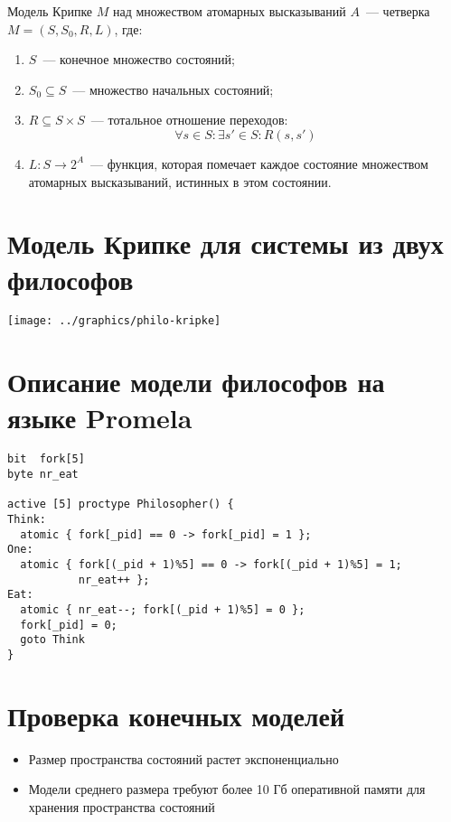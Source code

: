 \documentclass[12pt]{article}
\begin{document}
Модель Крипке $M$ над множеством атомарных высказываний $A$~--- четверка $M=(S, S_0, R,
L)$, где:
\begin{enumerate}
\item $S$~--- конечное множество состояний;
\item $S_0 \subseteq S$~--- множество начальных состояний;
\item $R \subseteq S \times S$~--- тотальное отношение переходов: $$\forall s \in S\colon \exists
  s' \in S \colon R(s, s')$$
\item $L: S \rightarrow 2^{A}$~--- функция, которая помечает каждое состояние множеством
  атомарных высказываний, истинных в этом состоянии.
\end{enumerate}

\section{Модель Крипке для системы из двух философов}
\label{sec:kripke-philo}

\begin{center}
  \texttt{[image: ../graphics/philo-kripke]}
\end{center}

\section{Описание модели философов на языке Promela}
\label{sec:prml-philo}

\begin{lstlisting}[language=Promela,style=simplecode]
bit  fork[5]
byte nr_eat

active [5] proctype Philosopher() {
Think:
  atomic { fork[_pid] == 0 -> fork[_pid] = 1 };
One:
  atomic { fork[(_pid + 1)%5] == 0 -> fork[(_pid + 1)%5] = 1; 
           nr_eat++ };
Eat:
  atomic { nr_eat--; fork[(_pid + 1)%5] = 0 };
  fork[_pid] = 0;
  goto Think
}  
\end{lstlisting}

\section{Проверка конечных моделей}
\label{sec:verif-troubles}

\begin{itemize}
\item Размер пространства состояний растет экспоненциально

\item Модели среднего размера требуют более 10 Гб оперативной памяти для хранения
  пространства состояний
\end{itemize}
\end{document}
